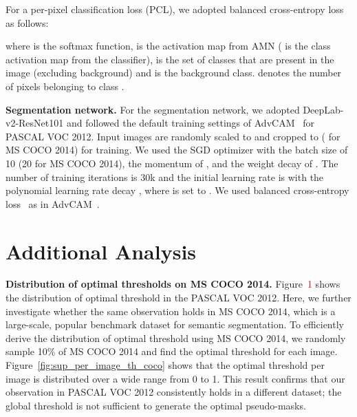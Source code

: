 \documentclass[10pt,twocolumn,letterpaper]{article}
\begin{document}
\noindent For a per-pixel classification loss (PCL), we adopted balanced cross-entropy loss~\cite{huang2018weakly} as follows:
\vspace{0mm}

\vspace{-2mm}

\noindent where  is the softmax function,  is the activation map from AMN ( is the class activation map from the classifier),  is the set of classes that are present in the image (excluding background) and  is the background class.  denotes the number of pixels belonging to class .

\vspace{1mm}

\noindent \textbf{Segmentation network.} 
For the segmentation network, we adopted DeepLab-v2-ResNet101 and followed the default training settings of AdvCAM~\cite{lee2021anti} for PASCAL VOC 2012. Input images are randomly scaled to  and cropped to  ( for MS COCO 2014) for training. We used the SGD optimizer with the batch size of 10 (20 for MS COCO 2014), the momentum of , and the weight decay of . The number of training iterations is 30k and the initial learning rate is  with the polynomial learning rate decay , where  is set to . We used balanced cross-entropy loss~\cite{huang2018weakly} as in AdvCAM~\cite{lee2021anti}.

\section{Additional Analysis}
\noindent \textbf{Distribution of optimal thresholds on MS COCO 2014.} Figure~\textcolor{red}{1} shows the distribution of optimal threshold in the PASCAL VOC 2012. Here, we further investigate whether the same observation holds in MS COCO 2014, which is a large-scale, popular benchmark dataset for semantic segmentation. To efficiently derive the distribution of optimal threshold using MS COCO 2014, we randomly sample 10\% of MS COCO 2014 and find the optimal threshold for each image. Figure~\ref{fig:sup_per_image_th_coco} shows that the optimal threshold per image is distributed over a wide range from 0 to 1. This result confirms that our observation in PASCAL VOC 2012 consistently holds in a different dataset; the global threshold is not sufficient to generate the optimal pseudo-masks. 

\vspace{1mm}
\end{document}
